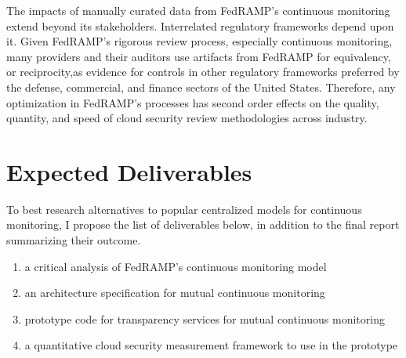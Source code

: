 \documentclass{jdf}
\begin{document}
The impacts of manually curated data from FedRAMP's continuous monitoring extend beyond its stakeholders. Interrelated regulatory frameworks depend upon it. Given FedRAMP's rigorous review process, especially continuous monitoring, many providers and their auditors use artifacts from FedRAMP for equivalency, or reciprocity,as evidence for controls in other regulatory frameworks preferred by the defense, commercial, and finance sectors of the United States. Therefore, any optimization in FedRAMP's processes has second order effects on the quality, quantity, and speed of cloud security review methodologies across industry.

\section{Expected Deliverables}

To best research alternatives to popular centralized models for continuous monitoring, I propose the list of deliverables below, in addition to the final report summarizing their outcome. 

\begin{enumerate}
    \item a critical analysis of FedRAMP's continuous monitoring model
    \item an architecture specification for mutual continuous monitoring
    \item prototype code for transparency services for mutual continuous monitoring
    \item a quantitative cloud security measurement framework to use in the prototype
\end{enumerate}



\end{document}
